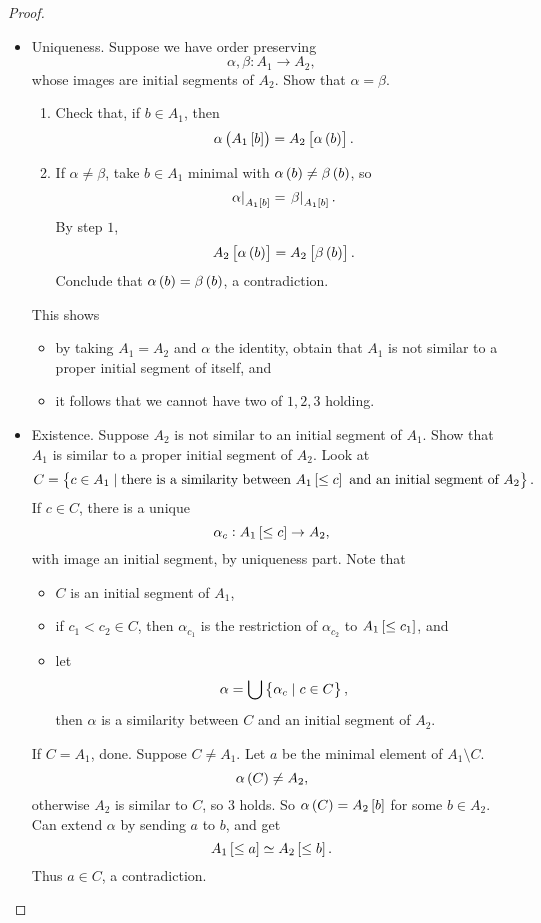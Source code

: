 \pagebreak

\begin{proof}
\hfill
\begin{itemize}
\item Uniqueness. Suppose we have order preserving
$$ \alpha, \beta : A_1 \to A_2, $$
whose images are initial segments of $ A_2 $. Show that $ \alpha = \beta $.
\begin{enumerate}[leftmargin=0.5in, label=Step \arabic*.]
\item Check that, if $ b \in A_1 $, then
$$ \alpha\br{A_1\sbr{b}} = A_2\sbr{\alpha\br{b}}. $$
\item If $ \alpha \ne \beta $, take $ b \in A_1 $ minimal with $ \alpha\br{b} \ne \beta\br{b} $, so
$$ \eval{\alpha}_{A_1\sbr{b}} = \eval{\beta}_{A_1\sbr{b}}. $$
By step $ 1 $,
$$ A_2\sbr{\alpha\br{b}} = A_2\sbr{\beta\br{b}}. $$
Conclude that $ \alpha\br{b} = \beta\br{b} $, a contradiction.
\end{enumerate}
This shows
\begin{itemize}
\item by taking $ A_1 = A_2 $ and $ \alpha $ the identity, obtain that $ A_1 $ is not similar to a proper initial segment of itself, and
\item it follows that we cannot have two of $ 1, 2, 3 $ holding.
\end{itemize}
\item Existence. Suppose $ A_2 $ is not similar to an initial segment of $ A_1 $. Show that $ A_1 $ is similar to a proper initial segment of $ A_2 $. Look at
$$ C = \cbr{c \in A_1 \mid \text{there is a similarity between} \ A_1\sbr{\le c} \ \text{and an initial segment of} \ A_2}. $$
If $ c \in C $, there is a unique
$$ \alpha_c : A_1\sbr{\le c} \to A_2, $$
with image an initial segment, by uniqueness part. Note that
\begin{itemize}
\item $ C $ is an initial segment of $ A_1 $,
\item if $ c_1 < c_2 \in C $, then $ \alpha_{c_1} $ is the restriction of $ \alpha_{c_2} $ to $ A_1\sbr{\le c_1} $, and
\item let
$$ \alpha = \bigcup \cbr{\alpha_c \mid c \in C}, $$
then $ \alpha $ is a similarity between $ C $ and an initial segment of $ A_2 $.
\end{itemize}
If $ C = A_1 $, done. Suppose $ C \ne A_1 $. Let $ a $ be the minimal element of $ A_1 \setminus C $.
$$ \alpha\br{C} \ne A_2, $$
otherwise $ A_2 $ is similar to $ C $, so $ 3 $ holds. So $ \alpha\br{C} = A_2\sbr{b} $ for some $ b \in A_2 $. Can extend $ \alpha $ by sending $ a $ to $ b $, and get
$$ A_1\sbr{\le a} \simeq A_2\sbr{\le b}. $$
Thus $ a \in C $, a contradiction.
\end{itemize}
\end{proof}

